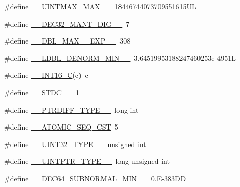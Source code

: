\begin{DoxyCompactItemize}
\#define \hyperlink{build-analizer__host-_desktop___qt__5__9__0___g_c_c__64bit-_release_2moc__predefs_8h_a36b3a5bf25feeef4fbdca37900522f3c}{\+\_\+\+\_\+\+U\+I\+N\+T\+M\+A\+X\+\_\+\+M\+A\+X\+\_\+\+\_\+}~18446744073709551615\+U\+L
\item 
\#define \hyperlink{build-analizer__host-_desktop___qt__5__9__0___g_c_c__64bit-_release_2moc__predefs_8h_a144dfa169f604d99b46658c15338338e}{\+\_\+\+\_\+\+D\+E\+C32\+\_\+\+M\+A\+N\+T\+\_\+\+D\+I\+G\+\_\+\+\_\+}~7
\item 
\#define \hyperlink{build-analizer__host-_desktop___qt__5__9__0___g_c_c__64bit-_release_2moc__predefs_8h_a280f0a9058cc03c2dac890a19881b1fb}{\+\_\+\+\_\+\+D\+B\+L\+\_\+\+M\+A\+X\+\_\+\_\+\+E\+X\+P\+\_\+\+\_\+}~308
\item 
\#define \hyperlink{build-analizer__host-_desktop___qt__5__9__0___g_c_c__64bit-_release_2moc__predefs_8h_a5436993e3c0ddb7caee4b9b01021cde4}{\+\_\+\+\_\+\+L\+D\+B\+L\+\_\+\+D\+E\+N\+O\+R\+M\+\_\+\+M\+I\+N\+\_\+\+\_\+}~3.\+64519953188247460253e-\/4951\+L
\item 
\#define \hyperlink{build-analizer__host-_desktop___qt__5__9__0___g_c_c__64bit-_release_2moc__predefs_8h_acefa39ff476ff22ce343809fff1e8bc1}{\+\_\+\+\_\+\+I\+N\+T16\+\_\+\+C}(c)~c
\item 
\#define \hyperlink{build-analizer__host-_desktop___qt__5__9__0___g_c_c__64bit-_release_2moc__predefs_8h_a8bdd19cad331a646ae8375be00e34cb3}{\+\_\+\+\_\+\+S\+T\+D\+C\+\_\+\+\_\+}~1
\item 
\#define \hyperlink{build-analizer__host-_desktop___qt__5__9__0___g_c_c__64bit-_release_2moc__predefs_8h_a726a020189392103a9404da070536e07}{\+\_\+\+\_\+\+P\+T\+R\+D\+I\+F\+F\+\_\+\+T\+Y\+P\+E\+\_\+\+\_\+}~long int
\item 
\#define \hyperlink{build-analizer__host-_desktop___qt__5__9__0___g_c_c__64bit-_release_2moc__predefs_8h_a0609dc2b702d5980de44c01bd373136a}{\+\_\+\+\_\+\+A\+T\+O\+M\+I\+C\+\_\+\+S\+E\+Q\+\_\+\+C\+S\+T}~5
\item 
\#define \hyperlink{build-analizer__host-_desktop___qt__5__9__0___g_c_c__64bit-_release_2moc__predefs_8h_af4eb6c3c4da52a7fe202626ac4dc360e}{\+\_\+\+\_\+\+U\+I\+N\+T32\+\_\+\+T\+Y\+P\+E\+\_\+\+\_\+}~unsigned int
\item 
\#define \hyperlink{build-analizer__host-_desktop___qt__5__9__0___g_c_c__64bit-_release_2moc__predefs_8h_a1c54273d3f148c51ad48fd738d1e6cbe}{\+\_\+\+\_\+\+U\+I\+N\+T\+P\+T\+R\+\_\+\+T\+Y\+P\+E\+\_\+\+\_\+}~long unsigned int
\item 
\#define \hyperlink{build-analizer__host-_desktop___qt__5__9__0___g_c_c__64bit-_release_2moc__predefs_8h_a6d3e36bb5d7e7ce3eda28fb174e404c6}{\+\_\+\+\_\+\+D\+E\+C64\+\_\+\+S\+U\+B\+N\+O\+R\+M\+A\+L\+\_\+\+M\+I\+N\+\_\+\+\_\+}~0.\+E-\/383\+D\+D

\end{DoxyCompactItemize}
